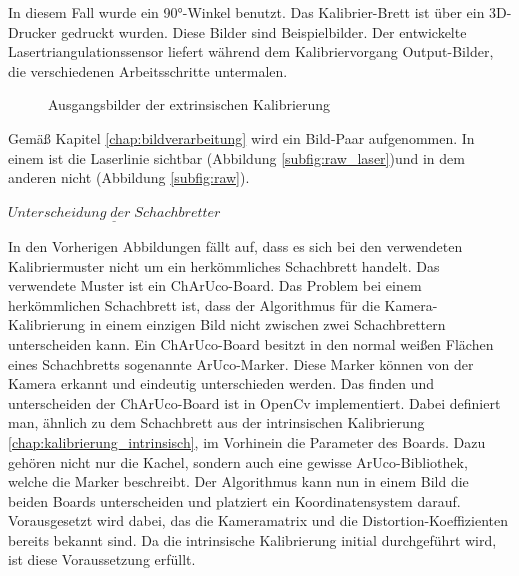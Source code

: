 		In diesem Fall wurde ein 90°-Winkel benutzt. Das Kalibrier-Brett ist über ein 3D-Drucker gedruckt wurden. Diese Bilder sind Beispielbilder. Der entwickelte Lasertriangulationssensor liefert während dem Kalibriervorgang Output-Bilder, die verschiedenen Arbeitsschritte untermalen.
		\begin{figure}[h]
			\centering
			\caption{Ausgangsbilder der extrinsischen Kalibrierung}
			\label{fig:ext-calib-raw}
		\end{figure} 
	
		Gemäß Kapitel \ref{chap:bildverarbeitung} wird ein Bild-Paar aufgenommen. In einem ist die Laserlinie sichtbar (Abbildung \ref{subfig:raw_laser})und in dem anderen nicht (Abbildung \ref{subfig:raw}).
		
		$\underline{Unterscheidung \; der \; Schachbretter}$
		
		In den Vorherigen Abbildungen fällt auf, dass es sich bei den verwendeten Kalibriermuster nicht um ein herkömmliches Schachbrett handelt. Das verwendete Muster ist ein ChArUco-Board. Das Problem bei einem herkömmlichen Schachbrett ist, dass der Algorithmus für die Kamera-Kalibrierung in einem einzigen Bild nicht zwischen zwei Schachbrettern unterscheiden kann. Ein ChArUco-Board besitzt in den normal weißen Flächen eines Schachbretts sogenannte ArUco-Marker. Diese Marker können von der Kamera erkannt und eindeutig unterschieden werden. Das finden und unterscheiden der ChArUco-Board ist in OpenCv implementiert. Dabei definiert man, ähnlich zu dem Schachbrett aus der intrinsischen Kalibrierung \ref{chap:kalibrierung_intrinsisch}, im Vorhinein die Parameter des Boards. Dazu gehören nicht nur die Kachel, sondern auch eine gewisse ArUco-Bibliothek, welche die Marker beschreibt. Der Algorithmus kann nun in einem Bild die beiden Boards unterscheiden und platziert ein Koordinatensystem darauf. Vorausgesetzt wird dabei, das die Kameramatrix und die Distortion-Koeffizienten bereits bekannt sind. Da die intrinsische Kalibrierung initial durchgeführt wird, ist diese Voraussetzung erfüllt.  
		
